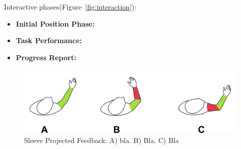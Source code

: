 Interactive phases(Figure~\ref{fig:interaction}):
\begin{itemize}
\item {\bf Initial Position Phase:}
\item {\bf Task Performance:}
\item {\bf Progress Report:}
\end{itemize}



\begin{figure}[!b]
    \begin{center}
        \includegraphics[width=\columnwidth]{imgs/visualfeedback.png}
    \end{center}
    \caption{Sleeve Projected Feedback: A) bla. B) Bla. C) Bla}
    \label{fig:vision}
\end{figure}